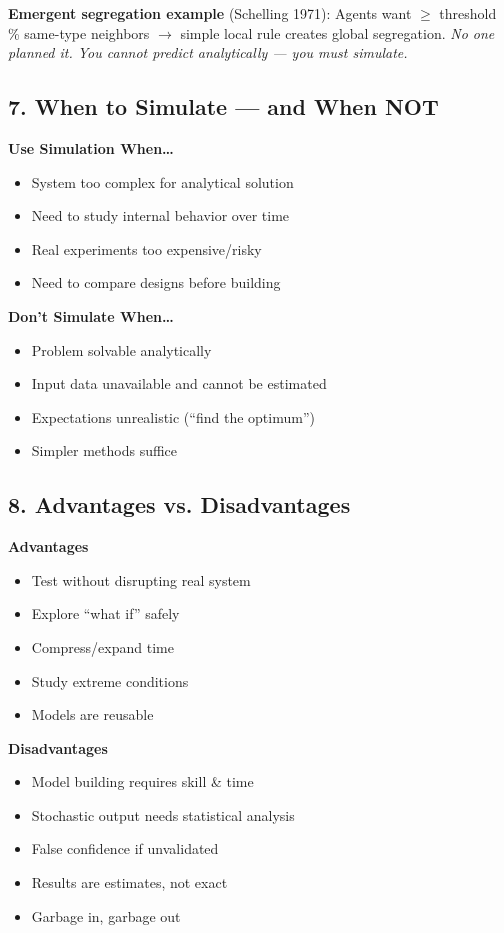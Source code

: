 \documentclass[11pt]{article}
\begin{document}
\textbf{Emergent segregation example} (Schelling 1971):  
Agents want $\geq$ threshold \% same-type neighbors $\rightarrow$ simple local rule creates global segregation. \textit{No one planned it. You cannot predict analytically --- you must simulate.}

\subsection*{7. When to Simulate --- and When NOT}
\textbf{Use Simulation When\ldots{}}
\begin{itemize}[leftmargin=*]
\item System too complex for analytical solution  
\item Need to study internal behavior over time  
\item Real experiments too expensive/risky  
\item Need to compare designs before building
\end{itemize}

\textbf{Don't Simulate When\ldots{}}
\begin{itemize}[leftmargin=*]
\item Problem solvable analytically  
\item Input data unavailable and cannot be estimated  
\item Expectations unrealistic (``find the optimum'')  
\item Simpler methods suffice
\end{itemize}

\subsection*{8. Advantages vs. Disadvantages}
\textbf{Advantages}
\begin{itemize}[leftmargin=*]
\item Test without disrupting real system  
\item Explore ``what if'' safely  
\item Compress/expand time  
\item Study extreme conditions  
\item Models are reusable
\end{itemize}

\textbf{Disadvantages}
\begin{itemize}[leftmargin=*]
\item Model building requires skill \& time  
\item Stochastic output needs statistical analysis  
\item False confidence if unvalidated  
\item Results are estimates, not exact  
\item Garbage in, garbage out
\end{itemize}
\end{document}
